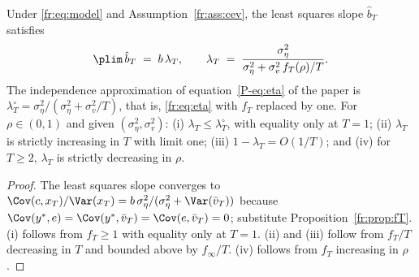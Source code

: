 \begin{proposition}
\label{fr:prop:eta}
Under \eqref{fr:eq:model} and Assumption~\ref{fr:ass:cev}, the least
squares slope $\hat b_T$ satisfies
\begin{equation}
\plim\,\hat b_T \;=\; b\,\lambda_T, \qquad
\lambda_T \;=\; \frac{\sigma^2_\eta}{\sigma^2_\eta + \sigma^2_v\, f_T(\rho)/T}.
\label{fr:eq:eta}
\end{equation}
The independence approximation of equation~\eqref{P-eq:eta} of the paper
is $\lambda^{\circ}_T = \sigma^2_\eta/(\sigma^2_\eta + \sigma^2_v/T)$, that is,
\eqref{fr:eq:eta} with $f_T$ replaced by one. For $\rho \in (0,1)$ and
given $(\sigma^2_\eta, \sigma^2_v)$:
(i) $\lambda_T \le \lambda^{\circ}_T$, with equality only at $T = 1$;
(ii) $\lambda_T$ is strictly increasing in $T$ with limit one;
(iii) $1 - \lambda_T = O(1/T)$; and
(iv) for $T \ge 2$, $\lambda_T$ is strictly decreasing in $\rho$.
\end{proposition}

\begin{proof}
The least squares slope converges to $\Cov(c, x_T)/\Var(x_T) =
b\,\sigma^2_\eta/(\sigma^2_\eta + \Var(\bar v_T))$ because
$\Cov(y^*, e) = \Cov(y^*, \bar v_T) = \Cov(e, \bar v_T) = 0$;
substitute Proposition~\ref{fr:prop:fT}. (i) follows from $f_T \ge 1$ with
equality only at $T = 1$. (ii) and (iii) follow from $f_T/T$ decreasing
in $T$ and bounded above by $f_\infty/T$. (iv) follows from $f_T$
increasing in $\rho$.
\end{proof}

